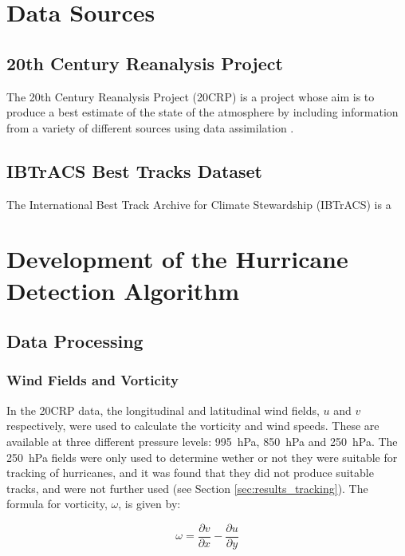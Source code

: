\documentclass[pdftex,12pt,a4paper]{report}
\begin{document}

\chapter{Data Sources}

\section{20th Century Reanalysis Project}
The 20th Century Reanalysis Project (20CRP) is a project whose aim is to produce a best estimate of
the state of the atmosphere by including information from a variety of different sources using data
assimilation \parencite{compoTwentieth2011}.

\section{IBTrACS Best Tracks Dataset}
The International Best Track Archive for Climate Stewardship (IBTrACS) 
\parencite{knappInternational2010} is a 

\chapter{Development of the Hurricane Detection Algorithm}

\section{Data Processing}

\subsection{Wind Fields and Vorticity}

In the 20CRP data, the longitudinal and latitudinal wind fields, $u$ and $v$ respectively, were used
to calculate the vorticity and wind speeds. These are available at three different pressure levels:
\SI{995}{hPa}, \SI{850}{hPa} and \SI{250}{hPa}. The \SI{250}{hPa} fields were only used to determine
wether or not they were suitable for tracking of hurricanes, and it was found that they did not
produce suitable tracks, and were not further used (see Section \ref{sec:results_tracking}). The
formula for vorticity, $\omega$, is given by:

\begin{equation}
    \omega = \frac{\partial v}{\partial x} - \frac{\partial u}{\partial y}
    \label{eqn:vorticity}
\end{equation}
\end{document}
